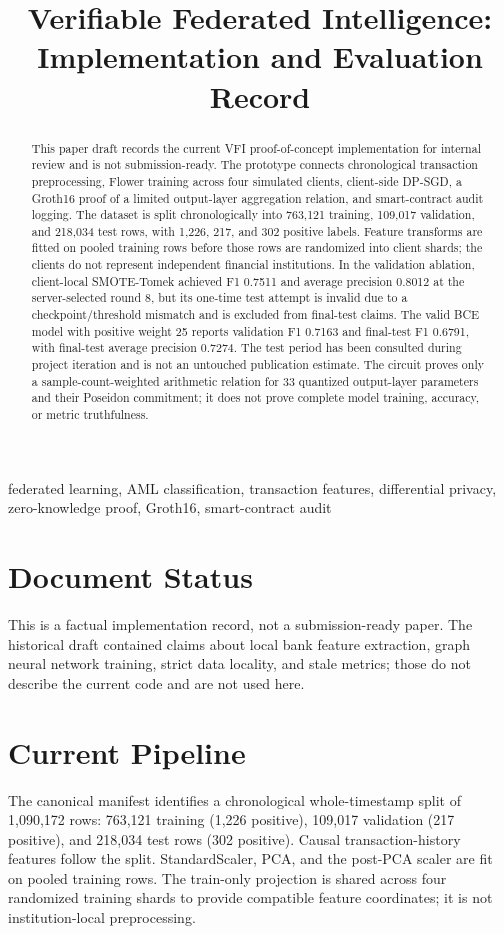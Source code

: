 \documentclass[10pt,conference,letterpaper]{IEEEtran}
\title{Verifiable Federated Intelligence: Implementation and Evaluation Record}
\author{\IEEEauthorblockN{Project Documentation Draft}}
\begin{document}
\maketitle

\begin{abstract}
This paper draft records the current VFI proof-of-concept implementation for internal review and is not submission-ready. The prototype connects chronological transaction preprocessing, Flower training across four simulated clients, client-side DP-SGD, a Groth16 proof of a limited output-layer aggregation relation, and smart-contract audit logging. The dataset is split chronologically into 763,121 training, 109,017 validation, and 218,034 test rows, with 1,226, 217, and 302 positive labels. Feature transforms are fitted on pooled training rows before those rows are randomized into client shards; the clients do not represent independent financial institutions. In the validation ablation, client-local SMOTE-Tomek achieved F1 0.7511 and average precision 0.8012 at the server-selected round 8, but its one-time test attempt is invalid due to a checkpoint/threshold mismatch and is excluded from final-test claims. The valid BCE model with positive weight 25 reports validation F1 0.7163 and final-test F1 0.6791, with final-test average precision 0.7274. The test period has been consulted during project iteration and is not an untouched publication estimate. The circuit proves only a sample-count-weighted arithmetic relation for 33 quantized output-layer parameters and their Poseidon commitment; it does not prove complete model training, accuracy, or metric truthfulness.
\end{abstract}

\begin{IEEEkeywords}
federated learning, AML classification, transaction features, differential privacy, zero-knowledge proof, Groth16, smart-contract audit
\end{IEEEkeywords}

\section{Document Status}
This is a factual implementation record, not a submission-ready paper. The historical draft contained claims about local bank feature extraction, graph neural network training, strict data locality, and stale metrics; those do not describe the current code and are not used here.

\section{Current Pipeline}
The canonical manifest identifies a chronological whole-timestamp split of 1,090,172 rows: 763,121 training (1,226 positive), 109,017 validation (217 positive), and 218,034 test rows (302 positive). Causal transaction-history features follow the split. StandardScaler, PCA, and the post-PCA scaler are fit on pooled training rows. The train-only projection is shared across four randomized training shards to provide compatible feature coordinates; it is not institution-local preprocessing.
\end{document}
